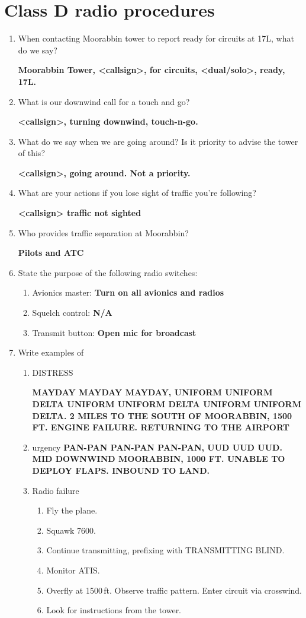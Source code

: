 \documentclass[11pt]{article}
\begin{document}
\section{Class D radio procedures}
\begin{enumerate}
	\item When contacting Moorabbin tower to report ready for circuits at 17L, what do we say?

	\textbf{Moorabbin Tower, <callsign>, for circuits, <dual/solo>, ready, 17L.}
	\item What is our downwind call for a touch and go?

	\textbf{<callsign>, turning downwind, touch-n-go.}
	\item What do we say when we are going around? Is it priority to advise the tower of this?
	
	\textbf{<callsign>, going around. Not a priority.}
	\item What are your actions if you lose sight of traffic you're following?

	\textbf{<callsign> traffic not sighted}
	\item Who provides traffic separation at Moorabbin?

	\textbf{Pilots and ATC}
	\item State the purpose of the following radio switches:
	\begin{enumerate}
		\item Avionics master: \textbf{Turn on all avionics and radios}
		\item Squelch control: \textbf{N/A}
		\item Transmit button: \textbf{Open mic for broadcast}
	\end{enumerate}
	\item Write examples of 
	\begin{enumerate}
		\item DISTRESS

		\textbf{MAYDAY MAYDAY MAYDAY, UNIFORM UNIFORM DELTA UNIFORM UNIFORM DELTA UNIFORM UNIFORM DELTA. 2 MILES TO THE SOUTH OF MOORABBIN, 1500 FT. ENGINE FAILURE. RETURNING TO THE AIRPORT}
		\item urgency \textbf{PAN-PAN PAN-PAN PAN-PAN, UUD UUD UUD. MID DOWNWIND MOORABBIN, 1000 FT. UNABLE TO DEPLOY FLAPS. INBOUND TO LAND.}
		\item Radio failure
		\begin{enumerate}
			\item Fly the plane.
			\item Squawk 7600.
			\item Continue transmitting, prefixing with TRANSMITTING BLIND.
			\item Monitor ATIS.
			\item Overfly at 1500\,ft. Observe traffic pattern. Enter circuit via crosswind.
			\item Look for instructions from the tower.
		\end{enumerate}
	\end{enumerate}
\end{enumerate}
\end{document}
